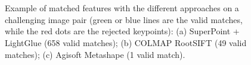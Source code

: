 \begin{figure}
    \centering
     \\ 
     \\
    \caption{Example of matched features with the different approaches on a challenging image pair (green or blue lines are the valid matches, while the red dots are the rejected keypoints): (a) SuperPoint + LightGlue (658 valid matches); (b) COLMAP RootSIFT (49 valid matches); (c) Agisoft Metashape (1 valid match).}
    \label{fig:5:castle_matches}
\end{figure}

